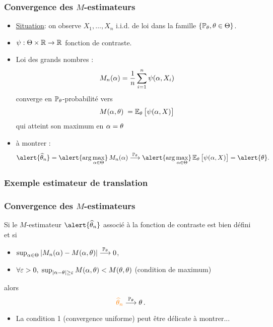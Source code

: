 \begin{frame}
\frametitle{Convergence des $M$-estimateurs}
\begin{itemize}
\item \underline{Situation}: on observe $X_1,\ldots, X_n$ i.i.d. de loi dans la famille $\{\operatorname{{\mathbb P}}_\theta, \theta \in \Theta\}$.
\item $\psi:\Theta \times \operatorname{{\mathbb R}} \rightarrow \operatorname{{\mathbb R}}$ \alert{fonction de contraste}.
\item \alert{Loi des grands nombres :}
$$
M_n(\alpha)=\frac{1}{n}\sum_{i = 1}^n \psi(\alpha,X_i)
$$
converge en $\operatorname{{\mathbb P}}_\theta$-probabilité vers
$$M(\alpha,\theta)\;=\operatorname{{\mathbb E}}_\theta\big[\psi(\alpha,X)\big]$$
\alert{ qui atteint son maximum en $\alpha=\theta$}
\item  à montrer :
$$\alert{\est}= \alert{
\arg \max_{\curtheta \in \Theta}}\, M_n(\curtheta)
\stackrel{\PP_\truetheta}{\longrightarrow} \alert{\arg \max_{\curtheta
\in \Theta}}
\E_\truetheta\big[\psi(\curtheta,X)\big]=\alert{\truetheta}.$$
\end{itemize}
\end{frame}

\begin{frame}
\frametitle{Exemple estimateur de translation}

\end{frame}

\begin{frame}
\frametitle{Convergence des $M$-estimateurs}
\begin{prop}
Si le $M$-estimateur $\alert{\est}$ associé à la fonction de contraste est bien défini et si
\begin{itemize}
\item $\sup_{\alpha \in \Theta}|M_n(\alpha)-M(\alpha,\theta)| \stackrel{\operatorname{{\mathbb P}}_\theta}{\longrightarrow} 0$,
\item $\forall \varepsilon >0, \;\sup_{|\alpha-\theta| \geq \varepsilon}M(\alpha,\theta)<M(\theta,\theta)$ \alert{(condition de maximum)}
\end{itemize}
alors
$$
\tco{\est} \stackrel{\PP_\truetheta}{\longrightarrow} \truetheta \eqsp.
$$
\end{prop}
\begin{itemize}
\item La condition 1 (convergence uniforme) peut être délicate à montrer...
\end{itemize}
\end{frame}

